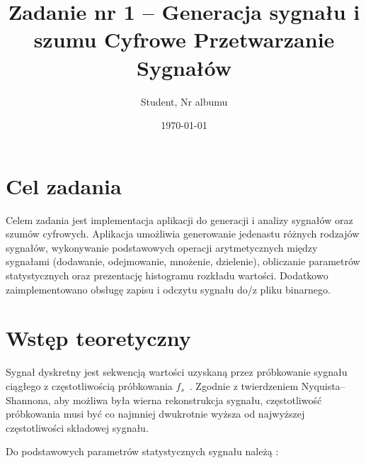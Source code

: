 \documentclass[12pt]{article}
\title{{\bf Zadanie nr 1 -- Generacja sygnału i szumu}\linebreak
Cyfrowe Przetwarzanie Sygnałów}
\author{Student, Nr albumu}
\date{\today}
\begin{document}
\clearpage\maketitle
\thispagestyle{empty}
\newpage
\setcounter{page}{1}

\section{Cel zadania}

Celem zadania jest implementacja aplikacji do generacji i analizy sygnałów
oraz szumów cyfrowych. Aplikacja umożliwia generowanie jedenastu różnych
rodzajów sygnałów, wykonywanie podstawowych operacji arytmetycznych
między sygnałami (dodawanie, odejmowanie, mnożenie, dzielenie),
obliczanie parametrów statystycznych oraz prezentację histogramu
rozkładu wartości. Dodatkowo zaimplementowano obsługę zapisu
i odczytu sygnału do/z pliku binarnego.

\section{Wstęp teoretyczny}

Sygnał dyskretny jest sekwencją wartości uzyskaną przez
próbkowanie sygnału ciągłego z częstotliwością
próbkowania $f_s$~\cite{oppenheim1999discrete}. Zgodnie z twierdzeniem
Nyquista--Shannona, aby możliwa była wierna rekonstrukcja sygnału,
częstotliwość próbkowania musi być co najmniej dwukrotnie wyższa
od najwyższej częstotliwości składowej sygnału.

Do podstawowych parametrów statystycznych sygnału należą
\cite{proakis2006dsp}:
\end{document}
